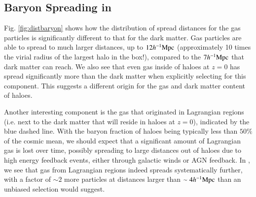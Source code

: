 \subsection{Baryon Spreading in \simba{}}

Fig. \ref{fig:distbaryon} shows how the distribution of spread distances
for the gas particles is significantly different to that for the dark matter.
Gas particles are able to spread to much larger distances, up to $12h^{-1}{\rm Mpc}{}$
(approximately 10 times the virial radius of the largest halo in the box!),
compared to the $7h^{-1}{\rm Mpc}{}$ that dark matter can reach. We also see that even
gas inside of haloes at $z=0$ has spread significantly more than the dark
matter when explicitly selecting for this component. This suggests a
different origin for the gas and dark matter content of haloes.

Another interesting component is the gas that originated in Lagrangian
regions (i.e. next to the dark matter that will reside in haloes at $z=0$),
indicated by the blue dashed line. With the baryon fraction of haloes being
typically less than $50\%$ of the cosmic mean, we should expect that a
significant amount of Lagrangian gas is lost over time, possibly spreading to
large distances out of haloes due to high energy feedback events, either
through galactic winds or AGN feedback. In \simba{}, we see that gas from
Lagrangian regions indeed spreads systematically further, with a factor of
$\sim 2$ more particles at distances larger than $\sim 4 h^{-1}{\rm Mpc}{}$ than an
unbiased selection would suggest.


